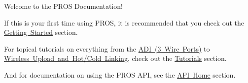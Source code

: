 Welcome to the PROS Documentation!

If this is your first time using PROS, it is recommended that you check out the \mbox{\hyperlink{getting-started}{Getting Started}} section.

For topical tutorials on everything from the \mbox{\hyperlink{adi_8md}{ADI (3 Wire Ports)}} to \mbox{\hyperlink{wireless-upload_8md}{Wireless Upload and Hot/\+Cold Linking}}, check out the \mbox{\hyperlink{tutorials}{Tutorials}} section.

And for documentation on using the PROS API, see the \mbox{\hyperlink{api}{API Home}} section. 